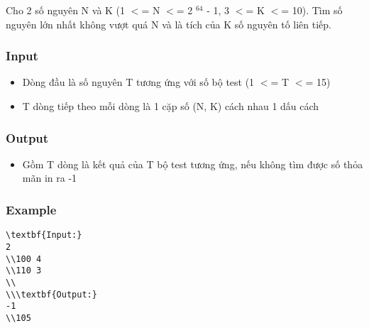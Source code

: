 



   Cho 2 số nguyên N và K (1 $<$= N $<$= 2   $^    64   $   - 1, 3 $<$= K $<$= 10). Tìm số nguyên lớn nhất không vượt quá N và là tích của K số nguyên tố liên tiếp.  

\subsubsection{   Input  }
\begin{itemize}
	\item     Dòng đầu là số nguyên T tương ứng với số bộ test (1 $<$= T $<$= 15)   
	\item     T dòng tiếp theo mỗi dòng là 1 cặp số (N, K) cách nhau 1 dấu cách   
\end{itemize}

\subsubsection{   Output  }
\begin{itemize}
	\item     Gồm T dòng là kết quả của T bộ test tương ứng, nếu không tìm được số thỏa mãn in ra -1   
\end{itemize}

\subsubsection{   Example  }
\begin{verbatim}
\textbf{Input:}
2
\\100 4
\\110 3
\\
\\\textbf{Output:}
-1
\\105 \end{verbatim}